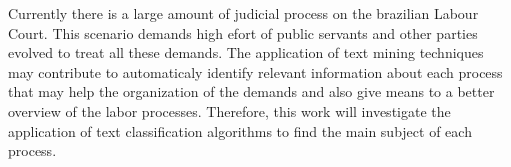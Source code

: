 Currently there is a large amount of judicial process on the brazilian Labour Court. This scenario demands high efort of public servants and other parties evolved to treat all these demands. The application of text mining techniques may contribute to automaticaly identify relevant information about each process that may help the organization of the demands and also give means to a better overview of the labor processes. Therefore, this work will investigate the application of text classification algorithms to find the main subject of each process. 